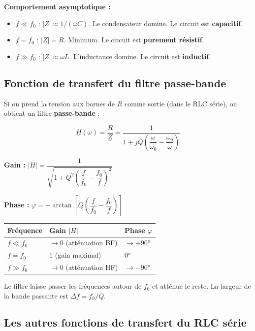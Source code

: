\documentclass[12pt,a4paper,twoside]{book}
\begin{document}
\textbf{Comportement asymptotique :}
\begin{itemize}[nosep]
\item \textbf{$f \ll f_0$} : $|Z| \approx 1/(\omega C)$. Le condensateur domine. Le circuit est \textbf{capacitif}.
\item \textbf{$f = f_0$} : $|Z| = R$. Minimum. Le circuit est \textbf{purement résistif}.
\item \textbf{$f \gg f_0$} : $|Z| \approx \omega L$. L'inductance domine. Le circuit est \textbf{inductif}.
\end{itemize}

\subsection{Fonction de transfert du filtre passe-bande}

Si on prend la tension aux bornes de $R$ comme sortie (dans le RLC série), on obtient un filtre \textbf{passe-bande} :

\begin{formule}
\[
\underline{H}(\omega) = \frac{R}{\underline{Z}} = \frac{1}{1 + jQ\left(\dfrac{\omega}{\omega_0} - \dfrac{\omega_0}{\omega}\right)}
\]

\textbf{Gain :} $|H| = \dfrac{1}{\sqrt{1 + Q^2\left(\dfrac{f}{f_0} - \dfrac{f_0}{f}\right)^2}}$

\textbf{Phase :} $\varphi = -\arctan\left[Q\left(\dfrac{f}{f_0} - \dfrac{f_0}{f}\right)\right]$
\end{formule}

\begin{center}
\begin{tabular}{lll}
\toprule
\textbf{Fréquence} & \textbf{Gain $|H|$} & \textbf{Phase $\varphi$} \\
\midrule
$f \ll f_0$ & $\to 0$ (atténuation BF) & $\to +90°$ \\
$f = f_0$ & $1$ (gain maximal) & $0°$ \\
$f \gg f_0$ & $\to 0$ (atténuation HF) & $\to -90°$ \\
\bottomrule
\end{tabular}
\end{center}

Le filtre laisse passer les fréquences autour de $f_0$ et atténue le reste. La largeur de la bande passante est $\Delta f = f_0/Q$.

\subsection{Les autres fonctions de transfert du RLC série}
\end{document}
